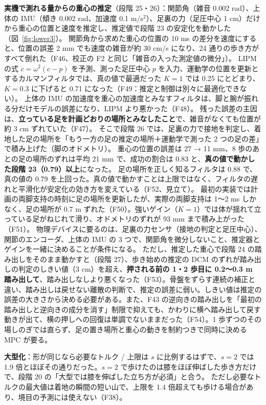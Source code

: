 \documentclass[paper=a4paper,fontsize=10pt,twocolumn,column_gap=2zw,line_length=24zw,number_of_lines=46,head_space=20mm]{jlreq}
\begin{document}
\textbf{実機で測れる量からの重心の推定}（段階 25・26）：関節角（雑音 0.002 rad）、上体の IMU（傾き 0.002 rad、加速度 0.1 m/s$^2$）、足裏の力（足圧中心 1 cm）だけから重心の位置と速度を推定し、推定値で段階 23 の安定化を動かした（図~\ref{fig:lower3}）。
関節角から求めた重心の位置の 10 ms の差分を速度にすると、位置の誤差 2 mm でも速度の雑音が約 30 cm/s になり、24 通りの歩き方がすべて倒れた（F46、校正の F2 と同じ「雑音の入った測定値の微分」）。
LIPM の式 $\ddot c=\omega^2(c-p)$ を予測、測った足圧中心 $p$ を入力、運動学の位置を更新とするカルマンフィルタでは、真の値で最適だった $K=1$ では 0.25 にとどまり、$K=0.3$ に下げると 0.71 になった（F49：推定と制御は別々に最適化できない）。
上体の IMU の加速度を重心の加速度とみなすフィルタは、脚と腕が振れる分だけモデルの誤差になり、LIPM より悪かった（F48）。
残った誤差の主因は、\textbf{立っている足を計画どおりの場所とみなしたこと}で、雑音がなくても位置が約 3 cm ずれていた（F47）。
そこで段階 26 では、足裏の力で接地を判定し、着地した足の場所を「もう一方の足の推定の場所＋運動学で測った 2 つの足の差」で積み上げた（脚のオドメトリ）。
重心の位置の誤差は 27 → 11 mm、8 歩のあとの足の場所のずれは平均 21 mm で、成功の割合は 0.83 と、\textbf{真の値で動かした段階 23（0.79）以上}になった。
足の場所を正しく知るフィルタは 0.88 で、真の値の 0.79 を上回った。真の値で動かすことは上限ではなく、フィルタの遅れと平滑化が安定化の効き方を変えている（F52、見立て）。
最初の実装では計画の両脚支持の時刻に足の場所を更新したが、実際の両脚支持は 1〜2 ms しかなく、足の場所が 0.7 m ずれた（F50）。強いゲイン（$K=1$）では体が揺れて立っている足がねじれて滑り、オドメトリのずれが 93 mm まで積み上がった（F51）。
物理デバイスに要るのは、足裏の力センサ（接地の判定と足圧中心）、関節のエンコーダ、上体の IMU の 3 つで、関節角を微分しないこと、推定器とゲインを一緒に決めることが条件になる。
ただし、推定した重心で段階 24 の踏み出しをそのまま動かすと（段階 27）、歩き始めの推定の DCM のずれが踏み出しの判定のしきい値（3 cm）を超え、\textbf{押される前の 1・2 歩目に 0.2〜0.3 m 踏み出して}、踏み出しなしより悪くなった（F53）。骨盤をずらす連続の補正と違い、踏み出しは戻せない離散の判断で、推定の誤差に弱い。しきい値は推定の誤差の大きさから決める必要がある。また、F43 の逆向きの踏み出しを「最初の踏み出しと逆向きの成分を消す」制限で抑えても、かわりに横へ踏み出して戻す動きが出て、横の押しへの回復は単調でないままだった（F54）。1 歩ずつのその場しのぎでは直らず、足の置き場所と重心の動きを制約つきで同時に決める MPC が要る。

\textbf{大型化}：形が同じなら必要なトルク / 上限は $s$ に比例するはずで、$s=2$ では 1.9 倍とほぼその通りだった。$s=2$ で歩けたのは膝をほぼ伸ばした歩き方だけで、段階 20 の「大型では膝を伸ばした立ち方が必須」と合う。
ただし必要なトルクの最大値は着地の瞬間の短い山で、上限を 1.4 倍超えても歩ける場合があり、境目の予測には使えない（F38）。
\end{document}
